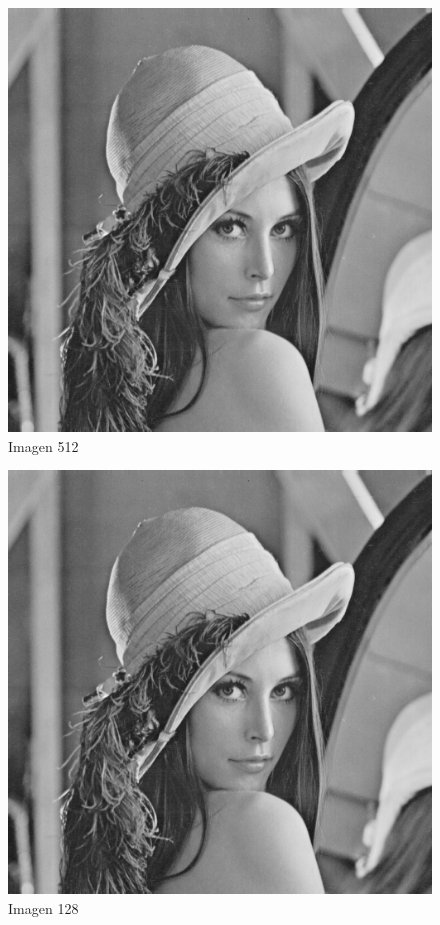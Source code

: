 \documentclass{article}
\begin{document}
\begin{multicols}{2}
\begin{figure}[H]
\centering
\includegraphics[scale=0.2]{../img/lena512.bmp}
\caption{Imagen 512}
\label{Imagen 512}
\end{figure}

\begin{figure}[H]
\centering
\includegraphics[scale=0.2]{../img/lena512.bmp}
\caption{Imagen 128}
\label{Imagen 128}
\end{figure}


\end{multicols}
\end{document}
